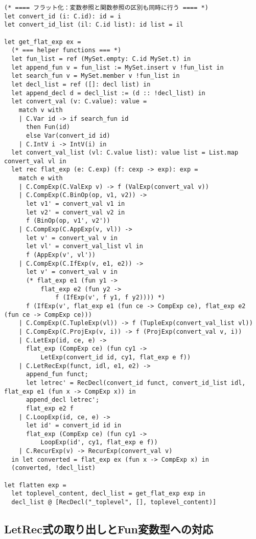 \begin{lstlisting}
(* ==== フラット化：変数参照と関数参照の区別も同時に行う ==== *)
let convert_id (i: C.id): id = i 
let convert_id_list (il: C.id list): id list = il

let get_flat_exp ex = 
  (* === helper functions === *)
  let fun_list = ref (MySet.empty: C.id MySet.t) in
  let append_fun v = fun_list := MySet.insert v !fun_list in
  let search_fun v = MySet.member v !fun_list in
  let decl_list = ref ([]: decl list) in
  let append_decl d = decl_list := (d :: !decl_list) in 
  let convert_val (v: C.value): value = 
    match v with
    | C.Var id -> if search_fun id 
      then Fun(id) 
      else Var(convert_id id)
    | C.IntV i -> IntV(i) in
  let convert_val_list (vl: C.value list): value list = List.map convert_val vl in
  let rec flat_exp (e: C.exp) (f: cexp -> exp): exp = 
    match e with
    | C.CompExp(C.ValExp v) -> f (ValExp(convert_val v))
    | C.CompExp(C.BinOp(op, v1, v2)) -> 
      let v1' = convert_val v1 in
      let v2' = convert_val v2 in
      f (BinOp(op, v1', v2'))
    | C.CompExp(C.AppExp(v, vl)) ->  
      let v' = convert_val v in
      let vl' = convert_val_list vl in
      f (AppExp(v', vl'))
    | C.CompExp(C.IfExp(v, e1, e2)) -> 
      let v' = convert_val v in
      (* flat_exp e1 (fun y1 -> 
          flat_exp e2 (fun y2 -> 
              f (IfExp(v', f y1, f y2)))) *)
      f (IfExp(v', flat_exp e1 (fun ce -> CompExp ce), flat_exp e2 (fun ce -> CompExp ce)))
    | C.CompExp(C.TupleExp(vl)) -> f (TupleExp(convert_val_list vl))
    | C.CompExp(C.ProjExp(v, i)) -> f (ProjExp(convert_val v, i))
    | C.LetExp(id, ce, e) -> 
      flat_exp (CompExp ce) (fun cy1 ->  
          LetExp(convert_id id, cy1, flat_exp e f))
    | C.LetRecExp(funct, idl, e1, e2) -> 
      append_fun funct;
      let letrec' = RecDecl(convert_id funct, convert_id_list idl, flat_exp e1 (fun x -> CompExp x)) in
      append_decl letrec';
      flat_exp e2 f
    | C.LoopExp(id, ce, e) -> 
      let id' = convert_id id in
      flat_exp (CompExp ce) (fun cy1 -> 
          LoopExp(id', cy1, flat_exp e f))
    | C.RecurExp(v) -> RecurExp(convert_val v)
  in let converted = flat_exp ex (fun x -> CompExp x) in
  (converted, !decl_list)

let flatten exp = 
  let toplevel_content, decl_list = get_flat_exp exp in
  decl_list @ [RecDecl("_toplevel", [], toplevel_content)]
\end{lstlisting}

\subsection*{LetRec式の取り出しとFun変数型への対応}


